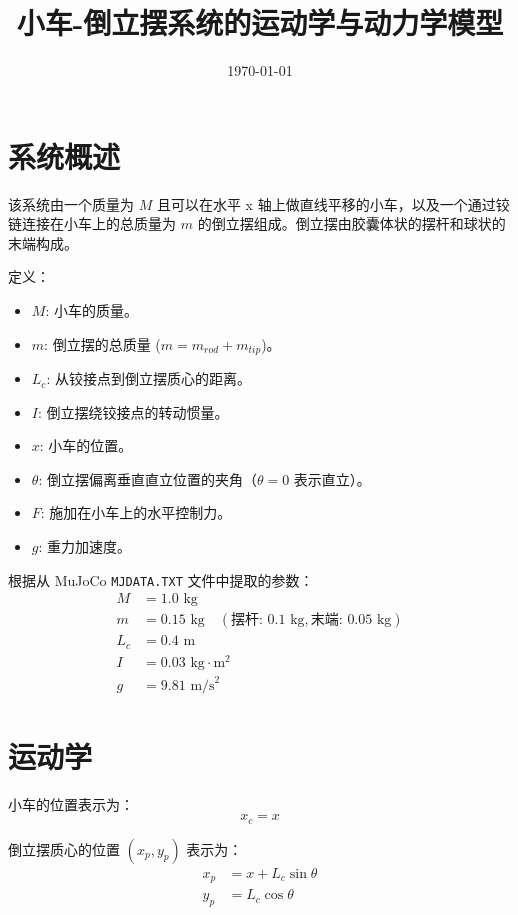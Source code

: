 \documentclass[a4paper,12pt]{article}
\title{小车-倒立摆系统的运动学与动力学模型}
\author{}
\date{\today}
\begin{document}
\maketitle

\section{系统概述}
该系统由一个质量为 $M$ 且可以在水平 x 轴上做直线平移的小车，以及一个通过铰链连接在小车上的总质量为 $m$ 的倒立摆组成。倒立摆由胶囊体状的摆杆和球状的末端构成。

定义：
\begin{itemize}
    \item $M$: 小车的质量。
    \item $m$: 倒立摆的总质量 ($m = m_{rod} + m_{tip}$)。
    \item $L_c$: 从铰接点到倒立摆质心的距离。
    \item $I$: 倒立摆绕铰接点的转动惯量。
    \item $x$: 小车的位置。
    \item $\theta$: 倒立摆偏离垂直直立位置的夹角（$\theta = 0$ 表示直立）。
    \item $F$: 施加在小车上的水平控制力。
    \item $g$: 重力加速度。
\end{itemize}

根据从 MuJoCo \texttt{MJDATA.TXT} 文件中提取的参数：
\begin{align*}
    M &= 1.0 \text{ kg} \\
    m &= 0.15 \text{ kg} \quad (\text{摆杆: } 0.1\text{ kg}, \text{末端: } 0.05\text{ kg}) \\
    L_c &= 0.4 \text{ m} \\
    I &= 0.03 \text{ kg}\cdot\text{m}^2 \\
    g &= 9.81 \text{ m/s}^2
\end{align*}

\section{运动学}
小车的位置表示为：
\begin{equation}
    x_c = x
\end{equation}

倒立摆质心的位置 $(x_p, y_p)$ 表示为：
\begin{align}
    x_p &= x + L_c \sin\theta \\
    y_p &= L_c \cos\theta
\end{align}
\end{document}
